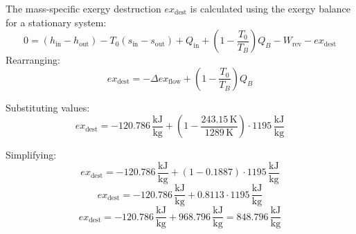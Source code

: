The mass-specific exergy destruction \( ex_{\text{dest}} \) is calculated using the exergy balance for a stationary system:  
\[
0 = (h_{\text{in}} - h_{\text{out}}) - T_0 (s_{\text{in}} - s_{\text{out}}) + Q_{\text{in}} + \left( 1 - \frac{T_0}{T_B} \right) Q_B - W_{\text{rev}} - ex_{\text{dest}}
\]
Rearranging:  
\[
ex_{\text{dest}} = -\Delta ex_{\text{flow}} + \left( 1 - \frac{T_0}{T_B} \right) Q_B
\]

Substituting values:  
\[
ex_{\text{dest}} = -120.786 \, \frac{\text{kJ}}{\text{kg}} + \left( 1 - \frac{243.15 \, \text{K}}{1289 \, \text{K}} \right) \cdot 1195 \, \frac{\text{kJ}}{\text{kg}}
\]

Simplifying:  
\[
ex_{\text{dest}} = -120.786 \, \frac{\text{kJ}}{\text{kg}} + \left( 1 - 0.1887 \right) \cdot 1195 \, \frac{\text{kJ}}{\text{kg}}
\]
\[
ex_{\text{dest}} = -120.786 \, \frac{\text{kJ}}{\text{kg}} + 0.8113 \cdot 1195 \, \frac{\text{kJ}}{\text{kg}}
\]
\[
ex_{\text{dest}} = -120.786 \, \frac{\text{kJ}}{\text{kg}} + 968.796 \, \frac{\text{kJ}}{\text{kg}} = 848.796 \, \frac{\text{kJ}}{\text{kg}}
\]